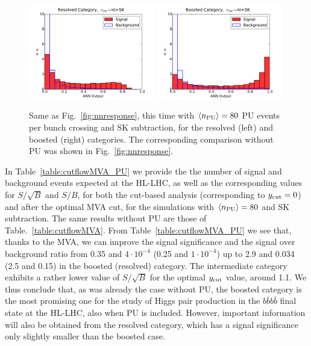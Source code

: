 \begin{figure}[t]
  \begin{center}
\includegraphics[width=0.49\textwidth]{plots/Resolved_disc_SKPU80.pdf}
\includegraphics[width=0.49\textwidth]{plots/Boosted_disc_SKPU80.pdf}
\caption{\small Same as Fig.~\ref{fig:nnresponse},
  this time with $\left\langle n_{\rm PU}\right\rangle=80$ PU events per bunch crossing
  and SK subtraction, for the resolved (left) and boosted
  (right) categories.
  The corresponding comparison without PU was shown in
  Fig.~\ref{fig:nnresponse}.
}
\label{fig:nnresponse_PU}
\end{center}
\end{figure}


In Table~\ref{table:cutflowMVA_PU}
we provide the  the number of signal and
    background events expected
    at the HL-LHC, as well as the
    corresponding values for $S/\sqrt{B}$ and $S/B$,
    for both the cut-based analysis (corresponding
    to $y_{\rm cut}=0$) and after the
    optimal MVA cut, for the simulations
    with $\left\langle n_{\rm PU}\right\rangle=80$
    and SK subtraction.
    The same results without PU are those of
    Table.~\ref{table:cutflowMVA}.
    From Table~\ref{table:cutflowMVA_PU} we see that, thanks
to the MVA, we can improve the signal significance and the
signal over background ratio from 0.35 and $4\cdot 10^{-4}$
(0.25 and $1\cdot 10^{-4}$) up to 2.9 and 0.034 (2.5 and 0.15)
in the boosted (resolved) category.
%
The intermediate category exhibits a rather lower value of $S/\sqrt{B}$
for the optimal $y_{\rm cut}$ value, around 1.1.
%
We thus conclude that, as was already the case
without PU,
the boosted category is the most promising
one for the study of Higgs pair production in the $b\bar{b}b\bar{b}$
final state
at the HL-LHC, also when PU is included.
%
However, important information will also be obtained from
the resolved category, which has a signal significance
only slightly smaller than the boosted case.


